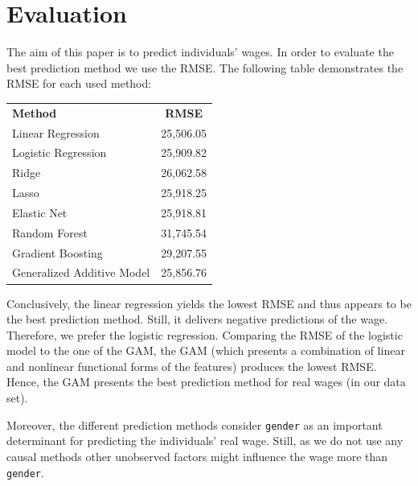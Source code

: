 \documentclass[11pt,a4paper]{article}
\begin{document}
\hypertarget{evaluation}{%
\section{Evaluation}\label{evaluation}}

The aim of this paper is to predict individuals' wages. In order to
evaluate the best prediction method we use the RMSE. The following table
demonstrates the RMSE for each used method: \medskip

\begin{tabular}{l c} 
\textbf{Method} & \textbf{RMSE} \\ 
Linear Regression & 25,506.05 \\ 
Logistic Regression & 25,909.82 \\ 
Ridge & 26,062.58 \\ 
Lasso & 25,918.25 \\
Elastic Net & 25,918.81 \\ 
Random Forest & 31,745.54 \\ 
Gradient Boosting & 29,207.55 \\ 
Generalized Additive Model & 25,856.76 \\
\end{tabular}

\medskip

Conclusively, the linear regression yields the lowest RMSE and thus
appears to be the best prediction method. Still, it delivers negative
predictions of the wage. Therefore, we prefer the logistic regression.
Comparing the RMSE of the logistic model to the one of the GAM, the GAM
(which presents a combination of linear and nonlinear functional forms
of the features) produces the lowest RMSE. Hence, the GAM presents the
best prediction method for real wages (in our data set).

Moreover, the different prediction methods consider \texttt{gender} as
an important determinant for predicting the individuals' real wage.
Still, as we do not use any causal methods other unobserved factors
might influence the wage more than \texttt{gender}.

\pagebreak

\printbibliography[title = References]
\cleardoublepage

\begin{refsection}
\nocite{R-base}
\nocite{R-Studio}


\end{refsection}
\end{document}
